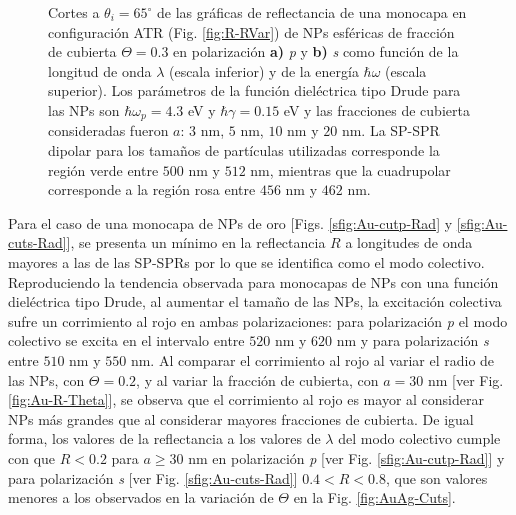 \begin{figure}[h!]
	\caption{Cortes a $\theta_i = 65^\circ$ de las gráficas de reflectancia de una monocapa en configuración ATR (Fig. \ref{fig:R-RVar}) de NPs esféricas de fracción de cubierta $\Theta = 0.3$ en polarización \textbf{a)} \emph{p} y \textbf{b)} \emph{s} como función de la longitud de onda $\lambda$ (escala inferior) y de la energía $\hbar\omega$ (escala superior). Los parámetros de la función dieléctrica tipo Drude para las NPs son $\hbar\omega_p = 4.3$ eV y $\hbar\gamma = 0.15$ eV y las fracciones de cubierta consideradas fueron $a$: $3$ nm, $5$ nm, $10$ nm y $20$ nm. La SP-SPR dipolar para los tamaños de partículas utilizadas corresponde la región verde entre $500$ nm y $512$ nm, mientras que la cuadrupolar corresponde a la región rosa entre $456$ nm y $462$ nm.}\label{fig:AuAg-Cuts-Rad}
	\end{figure}	

Para el caso de una monocapa de NPs de oro [Figs. \ref{sfig:Au-cutp-Rad} y \ref{sfig:Au-cuts-Rad}], se presenta un mínimo en la reflectancia $R$ a longitudes de onda mayores a las de las SP-SPRs por lo que se identifica como el modo colectivo. Reproduciendo la tendencia observada para monocapas de NPs con una función dieléctrica tipo Drude, al aumentar el tamaño de las NPs, la excitación colectiva sufre un corrimiento al rojo en ambas polarizaciones: para polarización \emph{p} el modo colectivo se excita en el intervalo entre $520$ nm y $620$ nm y para polarización \emph{s} entre $510$ nm y $550$ nm. Al comparar el corrimiento al rojo al variar el radio de las NPs, con $\Theta=0.2$, y al variar la fracción de cubierta, con $a=30$ nm [ver Fig. \ref{fig:Au-R-Theta}], se observa que el corrimiento al rojo es mayor al considerar NPs más grandes que al considerar mayores fracciones de cubierta. De igual forma, los valores de la reflectancia a los valores de $\lambda$ del modo colectivo cumple con que  $R<0.2$ para $a\geq 30$ nm en polarización \emph{p} [ver Fig. \ref{sfig:Au-cutp-Rad}] y  para polarización \emph{s}  [ver Fig. \ref{sfig:Au-cuts-Rad}] $0.4<R<0.8$, que son valores menores a los observados en la variación de $\Theta$ en la Fig. \ref{fig:AuAg-Cuts}.

